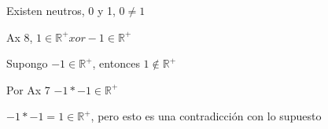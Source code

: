 \documentclass[10pt]{article}
\begin{document}
\begin{prf}[$1 \in \mathbb{R^{+}}$]{}

Existen neutros, 0 y 1, $0 \neq 1$

Ax 8, $1 \in \mathbb{R^{+}} xor -1 \in \mathbb{R^{+}}$

Supongo $-1 \in \mathbb{R^{+}}$, entonces $1 \notin \mathbb{R^{+}}$

Por Ax 7 $-1 * -1 \in \mathbb{R^{+}}$

$-1 * -1 = 1 \in \mathbb{R^{+}}$, pero esto es una contradicción con lo supuesto
\end{prf}
\end{document}
